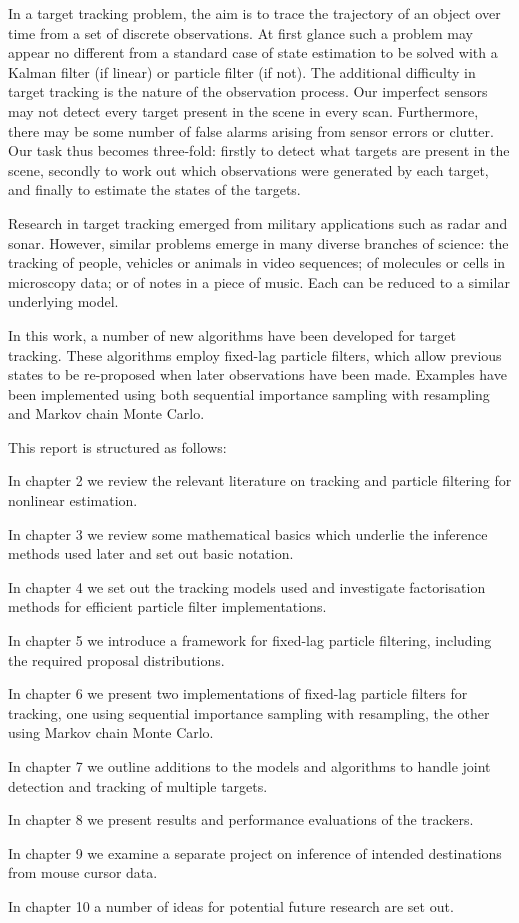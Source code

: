 In a target tracking problem, the aim is to trace the trajectory of an object over time from a set of discrete observations. At first glance such a problem may appear no different from a standard case of state estimation to be solved with a Kalman filter (if linear) or particle filter (if not). The additional difficulty in target tracking is the nature of the observation process. Our imperfect sensors may not detect every target present in the scene in every scan. Furthermore, there may be some number of false alarms arising from sensor errors or clutter. Our task thus becomes three-fold: firstly to detect what targets are present in the scene, secondly to work out which observations were generated by each target, and finally to estimate the states of the targets.

Research in target tracking emerged from military applications such as radar and sonar. However, similar problems emerge in many diverse branches of science: the tracking of people, vehicles or animals in video sequences; of molecules or cells in microscopy data; or of notes in a piece of music. Each can be reduced to a similar underlying model.

In this work, a number of new algorithms have been developed for target tracking. These algorithms employ fixed-lag particle filters, which allow previous states to be re-proposed when later observations have been made. Examples have been implemented using both sequential importance sampling with resampling and Markov chain Monte Carlo.

This report is structured as follows:

In chapter 2 we review the relevant literature on tracking and particle filtering for nonlinear estimation.

In chapter 3 we review some mathematical basics which underlie the inference methods used later and set out basic notation.

In chapter 4 we set out the tracking models used and investigate factorisation methods for efficient particle filter implementations.

In chapter 5 we introduce a framework for fixed-lag particle filtering, including the required proposal distributions.

In chapter 6 we present two implementations of fixed-lag particle filters for tracking, one using sequential importance sampling with resampling, the other using Markov chain Monte Carlo.

In chapter 7 we outline additions to the models and algorithms to handle joint detection and tracking of multiple targets.

In chapter 8 we present results and performance evaluations of the trackers.

In chapter 9 we examine a separate project on inference of intended destinations from mouse cursor data.

In chapter 10 a number of ideas for potential future research are set out.